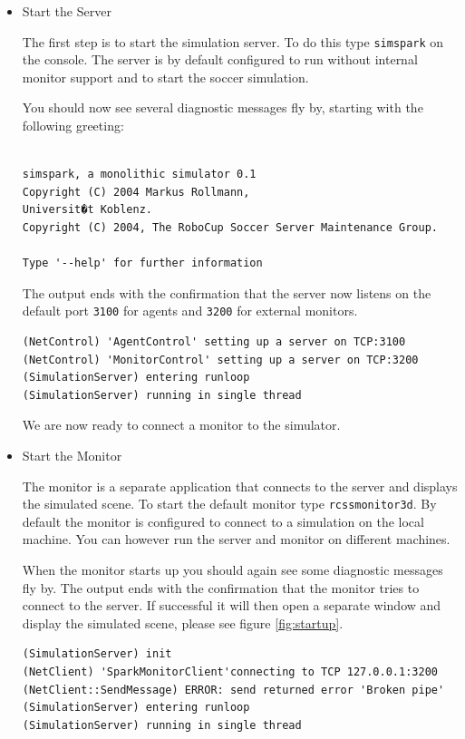 \begin{itemize}
\item{Start the Server}

The first step is to start the simulation server. To do this type
\texttt{simspark} on the console. The server is by default configured
to run without internal monitor support and to start the soccer
simulation. 

You should now see several diagnostic messages fly by, starting with
the following greeting:

\begin{verbatim}

simspark, a monolithic simulator 0.1
Copyright (C) 2004 Markus Rollmann,
Universit�t Koblenz.
Copyright (C) 2004, The RoboCup Soccer Server Maintenance Group.

Type '--help' for further information

\end{verbatim}

The output ends with the confirmation that the server now listens on
the default port \texttt{3100} for agents and \texttt{3200} for
external monitors.

\begin{verbatim}
(NetControl) 'AgentControl' setting up a server on TCP:3100
(NetControl) 'MonitorControl' setting up a server on TCP:3200
(SimulationServer) entering runloop
(SimulationServer) running in single thread
\end{verbatim}

We are now ready to connect a monitor to the simulator.


\item{Start the Monitor}

The monitor is a separate application that connects to the server and
displays the simulated scene. To start the default monitor type
\texttt{rcssmonitor3d}. By default the monitor is configured to connect to a simulation 
on the local machine. You can however run the server and monitor on
different machines.

When the monitor starts up you should again see some diagnostic
messages fly by. The output ends with the confirmation that the
monitor tries to connect to the server. If successful it will then open
a separate window and display the simulated scene, please see figure
\ref{fig:startup}.

\begin{verbatim}
(SimulationServer) init
(NetClient) 'SparkMonitorClient'connecting to TCP 127.0.0.1:3200
(NetClient::SendMessage) ERROR: send returned error 'Broken pipe'
(SimulationServer) entering runloop
(SimulationServer) running in single thread
\end{verbatim}


\end{itemize}
